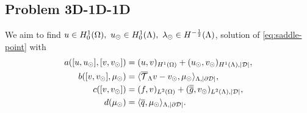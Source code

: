 \documentclass[r]{siamart171218}
\newcommand{\paoloold}[1]{{\color{black}#1}}
\begin{document}
\subsection{Problem 3D-1D-1D}
We aim to find $u \in H^1_0(\Omega),\ u_{\odot} \in H^1_0(\Lambda), \ \lambda_{\odot} \in H^{-\frac12}(\Lambda)$,
solution of \eqref{eq:saddle-point} with
\begin{align*}
a([u, \ud], [v, \vd])&= (u,v)_{H^1(\Omega)} + (\ud,\vd)_{H^1(\Lambda),|\D|},
\\
b([v, \vd], \md)&=  \langle  \mtrace v - \vd, \md \rangle_{\Lambda, |\DD|},
\\
c([v,\vd])&= (f,v)_{L^2(\Omega)} + (\avrd{g},\vd)_{L^2(\Lambda),|\D|},
\\
d(\md)&=\paoloold{\langle \avrc{q},\md\rangle_{\Lambda,|\DD|}}.
\end{align*}
\end{document}
